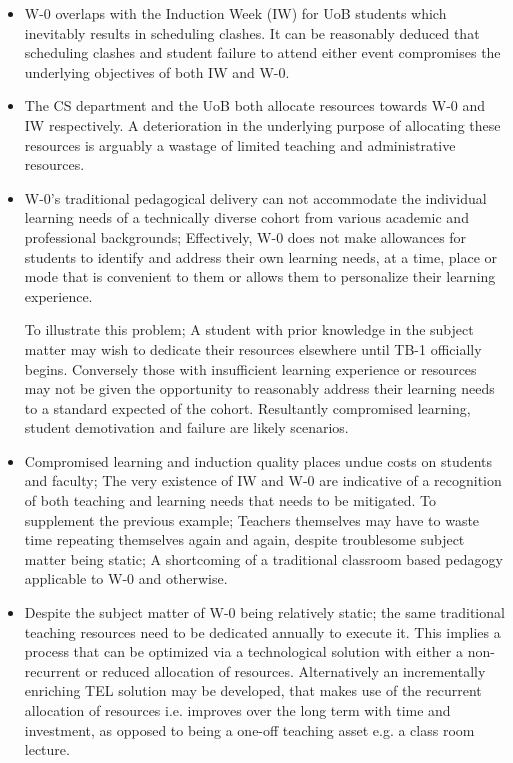 \begin{itemize}

    \item W-0 overlaps with the Induction Week (IW) for UoB students which inevitably results in scheduling clashes. It can be reasonably deduced that scheduling clashes and student failure to attend either event compromises the underlying objectives of both IW and W-0.
    
    \item The CS department and the UoB both allocate resources towards W-0 and IW respectively. A deterioration in the underlying purpose of allocating these resources is arguably a wastage of limited teaching and administrative resources.
    
    \newpage
    
    \item W-0's traditional pedagogical delivery can not accommodate the individual learning needs of a technically diverse cohort from various academic and professional backgrounds; Effectively, W-0 does not make allowances for students to identify and address their own learning needs, at a time, place or mode that is convenient to them or allows them to personalize their learning experience.
    
    To illustrate this problem; A student with prior knowledge in the subject matter may wish to dedicate their resources elsewhere until TB-1 officially begins. Conversely those with insufficient learning experience or  resources may not be given the opportunity to reasonably address their learning needs to a standard expected of the cohort. Resultantly compromised learning, student demotivation and failure are likely scenarios.
    
    \item Compromised learning and induction quality places undue costs on students and faculty; The very existence of IW and W-0 are indicative of a recognition of both teaching and learning needs that needs to be mitigated. To supplement the previous example; Teachers themselves may have to waste time repeating themselves again and again, despite troublesome subject matter being static; A shortcoming of a traditional classroom based pedagogy applicable to W-0 and otherwise.
    
    \item Despite the subject matter of W-0 being relatively static; the same traditional teaching resources need to be dedicated annually to execute it. This implies a process that can be optimized via a technological solution with either a non-recurrent or reduced allocation of resources. Alternatively an incrementally enriching TEL solution may be developed, that makes use of the recurrent allocation of resources i.e. improves over the long term with time and investment, as opposed to being a one-off teaching asset e.g. a class room lecture.
    
\end{itemize}




